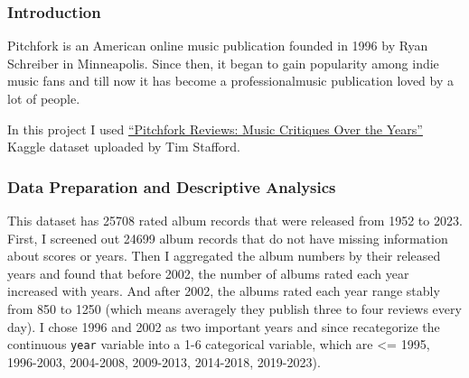 \documentclass[
]{article}
\newenvironment{Shaded}{\begin{snugshade}}{\end{snugshade}}
\newcommand{\AttributeTok}[1]{\textcolor[rgb]{0.13,0.29,0.53}{#1}}
\newcommand{\FunctionTok}[1]{\textcolor[rgb]{0.13,0.29,0.53}{\textbf{#1}}}
\newcommand{\NormalTok}[1]{#1}
\newcommand{\OtherTok}[1]{\textcolor[rgb]{0.56,0.35,0.01}{#1}}
\newcommand{\SpecialCharTok}[1]{\textcolor[rgb]{0.81,0.36,0.00}{\textbf{#1}}}
\begin{document}
\begin{Shaded}
\end{Shaded}

\begin{Shaded}
\end{Shaded}

\subsubsection{Introduction}\label{introduction}

Pitchfork is an American online music publication founded in 1996 by
Ryan Schreiber in Minneapolis. Since then, it began to gain popularity
among indie music fans and till now it has become a professionalmusic
publication loved by a lot of people.

In this project I used
\href{https://www.kaggle.com/datasets/timstafford/pitchfork-reviews}{``Pitchfork
Reviews: Music Critiques Over the Years''} Kaggle dataset uploaded by
Tim Stafford.

\subsubsection{Data Preparation and Descriptive
Analysics}\label{data-preparation-and-descriptive-analysics}

This dataset has 25708 rated album records that were released from 1952
to 2023. First, I screened out 24699 album records that do not have
missing information about scores or years. Then I aggregated the album
numbers by their released years and found that before 2002, the number
of albums rated each year increased with years. And after 2002, the
albums rated each year range stably from 850 to 1250 (which means
averagely they publish three to four reviews every day). I chose 1996
and 2002 as two important years and since recategorize the continuous
\texttt{year} variable into a 1-6 categorical variable, which are
\textless= 1995, 1996-2003, 2004-2008, 2009-2013, 2014-2018, 2019-2023).
\end{document}

